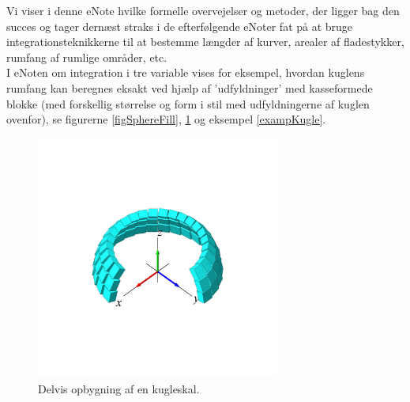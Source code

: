 Vi viser i denne eNote
hvilke formelle overvejelser og metoder, der ligger bag den
succes og tager dernæst straks i de efterfølgende eNoter fat på at bruge integrationsteknikkerne
til at bestemme længder af kurver, arealer af fladestykker, rumfang af
rumlige områder,
etc.\\


I eNoten om integration i tre variable vises for eksempel, hvordan kuglens rumfang kan beregnes eksakt ved hjælp af 'udfyldninger' med
kasseformede blokke (med forskellig størrelse og form i stil med udfyldningerne af kuglen ovenfor), se figurerne \ref{figSphereFill},
\ref{figKugleskal} og eksempel \ref{exampKugle}.


\begin{figure}[h]
\centerline{\includegraphics[height=80mm]{FIGS/plotKugleskal}}
\begin{center}
\caption{\small{Delvis opbygning af en  kugleskal.}} \label{figKugleskal}
\end{center}
\end{figure}




